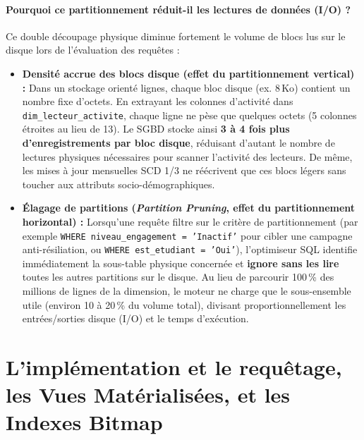 \documentclass[a4paper,12pt]{article}
\begin{document}
\paragraph{Pourquoi ce partitionnement réduit-il les lectures de données (I/O) ?}
Ce double découpage physique diminue fortement le volume de blocs lus sur le disque lors de l'évaluation des requêtes :
\begin{itemize}
  \item \textbf{Densité accrue des blocs disque (effet du partitionnement vertical) :} Dans un stockage orienté lignes, chaque bloc disque (ex. $8\,\text{Ko}$) contient un nombre fixe d'octets. En extrayant les colonnes d'activité dans \texttt{dim\_lecteur\_activite}, chaque ligne ne pèse que quelques octets (5 colonnes étroites au lieu de 13). Le SGBD stocke ainsi \textbf{3 à 4 fois plus d'enregistrements par bloc disque}, réduisant d'autant le nombre de lectures physiques nécessaires pour scanner l'activité des lecteurs. De même, les mises à jour mensuelles SCD 1/3 ne réécrivent que ces blocs légers sans toucher aux attributs socio-démographiques.
  \item \textbf{Élagage de partitions (\emph{Partition Pruning}, effet du partitionnement horizontal) :} Lorsqu'une requête filtre sur le critère de partitionnement (par exemple \texttt{WHERE niveau\_engagement = 'Inactif'} pour cibler une campagne anti-résiliation, ou \texttt{WHERE est\_etudiant = 'Oui'}), l'optimiseur SQL identifie immédiatement la sous-table physique concernée et \textbf{ignore sans les lire} toutes les autres partitions sur le disque. Au lieu de parcourir 100\,\% des millions de lignes de la dimension, le moteur ne charge que le sous-ensemble utile (environ 10 à 20\,\% du volume total), divisant proportionnellement les entrées/sorties disque (I/O) et le temps d'exécution.
\end{itemize}

\section{L’implémentation et le requêtage, les Vues Matérialisées, et les Indexes Bitmap}
\end{document}
